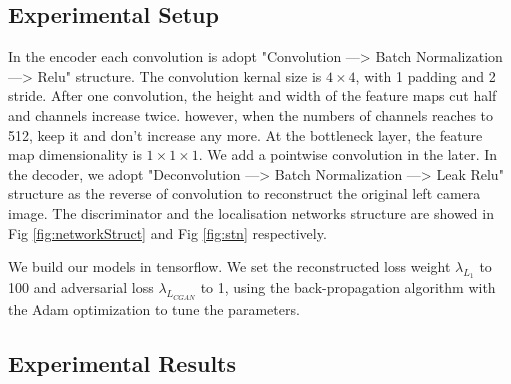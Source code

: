 \documentclass{IEEE_lsens}
\begin{document}
\subsection{Experimental Setup}

In the encoder each convolution is adopt "Convolution ---> Batch Normalization ---> Relu" structure. The convolution kernal size is $4 \times 4$, with 1 padding and 2 stride. After one convolution, the height and width of the feature maps cut half and channels increase twice. however, when the numbers of channels reaches to 512, keep it and don't increase any more. At the bottleneck layer, the feature map dimensionality is $1 \times 1 \times 1$. We add a pointwise convolution in the later. In the decoder, we adopt "Deconvolution ---> Batch Normalization ---> Leak Relu" structure as the reverse of convolution to reconstruct the original left camera image. The discriminator and the localisation networks structure are showed in Fig \ref{fig:networkStruct} and Fig \ref{fig:stn} respectively.

We build our models in tensorflow. We set the reconstructed loss weight ${\lambda}_{L_1}$ to 100 and adversarial loss ${\lambda}_{L_{CGAN}}$ to 1, using the back-propagation algorithm with the Adam \cite{Kingma2014:apa:Adam:} optimization to tune the parameters. 

\subsection{Experimental Results}
\end{document}
